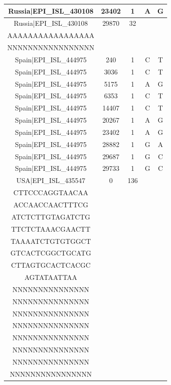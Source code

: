 \documentclass[a4paper,10pt]{article}
\begin{document}
\begin{longtable}{@{}ccccc@{}}
Russia|EPI\_ISL\_430108 & 23402 & 1 & A & G \\* \midrule
Russia|EPI\_ISL\_430108 & 29870 & 32 & \begin{tabular}[c]{@{}c@{}}AAAAAAAAAAAAAAA\\ AAAAAAAAAAAAAAAAA\end{tabular} & \begin{tabular}[c]{@{}c@{}}NNNNNNNNNNNNNNN\\ NNNNNNNNNNNNNNNNN\end{tabular} \\* \midrule
Spain|EPI\_ISL\_444975 & 240 & 1 & C & T \\* \midrule
Spain|EPI\_ISL\_444975 & 3036 & 1 & C & T \\* \midrule
Spain|EPI\_ISL\_444975 & 5175 & 1 & A & G \\* \midrule
Spain|EPI\_ISL\_444975 & 6353 & 1 & C & T \\* \midrule
Spain|EPI\_ISL\_444975 & 14407 & 1 & C & T \\* \midrule
Spain|EPI\_ISL\_444975 & 20267 & 1 & A & G \\* \midrule
Spain|EPI\_ISL\_444975 & 23402 & 1 & A & G \\* \midrule
Spain|EPI\_ISL\_444975 & 28882 & 1 & G & A \\* \midrule
Spain|EPI\_ISL\_444975 & 29687 & 1 & G & C \\* \midrule
Spain|EPI\_ISL\_444975 & 29733 & 1 & G & C \\* \midrule
USA|EPI\_ISL\_435547 & 0 & 136 & \begin{tabular}[c]{@{}c@{}}ATTAAAGGTTTATAC\\ CTTCCCAGGTAACAA\\ ACCAACCAACTTTCG\\ ATCTCTTGTAGATCTG\\ TTCTCTAAACGAACTT\\ TAAAATCTGTGTGGCT\\ GTCACTCGGCTGCATG\\ CTTAGTGCACTCACGC\\ AGTATAATTAA\end{tabular} & \begin{tabular}[c]{@{}c@{}}NNNNNNNNNNNNNNN\\ NNNNNNNNNNNNNNN\\ NNNNNNNNNNNNNNN\\ NNNNNNNNNNNNNNN\\ NNNNNNNNNNNNNNN\\ NNNNNNNNNNNNNNN\\ NNNNNNNNNNNNNNN\\ NNNNNNNNNNNNNNN\\ NNNNNNNNNNNNNNNN\end{tabular} \\* \midrule

\end{longtable}
\end{document}
